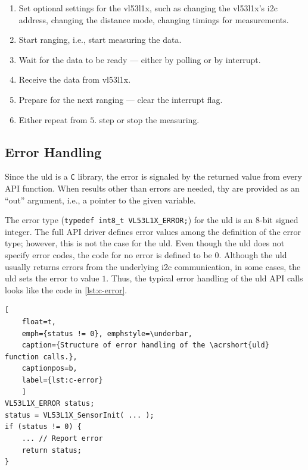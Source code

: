 \documentclass[
  digital,     %
  oneside,     %
  nosansbold,  %
  nocolorbold, %
  nolof,         %
  nolot,         %
]{fithesis4}
\begin{document}
{{{\begin{enumerate}
    \item  Set optional settings for the \gls{vl53l1x}, such as changing the \gls{vl53l1x}'s \acrshort{i2c} address, changing the distance mode, changing timings for measurements.
    
    \item Start ranging, i.e., start measuring the data.
    
    \item Wait for the data to be ready --- either by polling or by interrupt.
    
    \item Receive the data from \gls{vl53l1x}.
    
    \item Prepare for the next ranging --- clear the interrupt flag.
    
    \item Either repeat from $5.$ step or stop the measuring.
\end{enumerate}


\subsection{ Error Handling } \label{sec:uld-err}

Since the \acrshort{uld} is a \verb|C| library, the error is signaled by the returned value from every API function. When results other than errors are needed, thy are provided as an ``out'' argument, i.e., a pointer to the given variable.

The error type (\lstinline[breaklines=false]|typedef int8_t VL53L1X_ERROR;|) for the \acrshort{uld} is an 8-bit signed integer. The full API driver defines error values among the definition of the error type; however, this is not the case for the \acrshort{uld}. Even though the \acrshort{uld} does not specify error codes, the code for no error is defined to be $0$. Although the \acrshort{uld} usually returns errors from the underlying \acrshort{i2c} communication, in some cases, the \acrshort{uld} sets the error to value $1$. Thus, the typical error handling of the \acrshort{uld} API calls looks like the code in \autoref{lst:c-error}.

\begin{lstlisting}[
    float=t,
    emph={status != 0}, emphstyle=\underbar,
    caption={Structure of error handling of the \acrshort{uld} function calls.},
    captionpos=b,
    label={lst:c-error}
    ]
VL53L1X_ERROR status;
status = VL53L1X_SensorInit( ... );
if (status != 0) {
    ... // Report error
    return status;
}


\end{lstlisting}}}}
\end{document}
